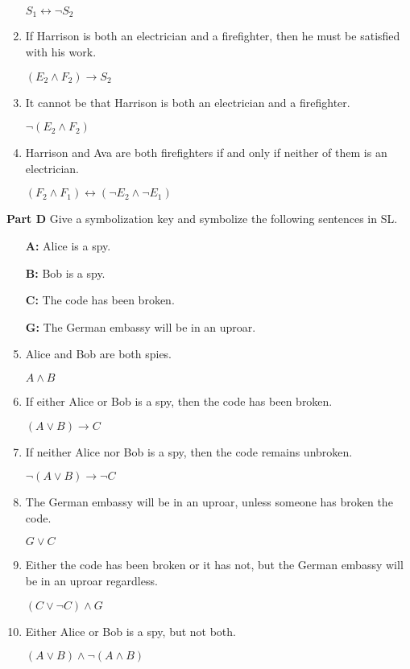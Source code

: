 \documentclass[12pt, letterpaper, twoside]{article}
\begin{document}
\begin{enumerate}
	$S_1 \leftrightarrow \neg S_2$

	\item If Harrison is both an electrician and a
          firefighter, then he must be satisfied with his
          work.

	$(E_2 \wedge F_2) \rightarrow S_2$

	\item It cannot be that Harrison is both an
          electrician and a firefighter.

	$\neg (E_2 \wedge F_2)$

	\item Harrison and Ava are both firefighters if and
          only if neither of them is an electrician.

	$(F_2 \wedge F_1) \leftrightarrow (\neg E_2 \wedge
          \neg E_1)$
\end{enumerate}

\noindent \textbf{Part D} Give a symbolization key and
symbolize the following sentences in SL.
\begin{enumerate}
	\item[\textbf{A:}] Alice is a spy.
	\item[\textbf{B:}] Bob is a spy.
	\item[\textbf{C:}] The code has been broken.
	\item[\textbf{G:}] The German embassy will be in an
          uproar.

	\item Alice and Bob are both spies.

	$A \wedge B$

	\item If either Alice or Bob is a spy, then the code
          has been broken.

	$(A \vee B) \rightarrow C$

	\item If neither Alice nor Bob is a spy, then the
          code remains unbroken.

	$\neg (A \vee B) \rightarrow \neg C$

	\item The German embassy will be in an uproar,
          unless someone has broken the code.

	$G \vee C$

	\item Either the code has been broken or it has not,
          but the German embassy will be in an uproar
          regardless.

	$(C \vee \neg C) \wedge G$

	\item Either Alice or Bob is a spy, but not both.

	$(A \vee B) \wedge \neg (A \wedge B)$
\end{enumerate}
\end{document}
